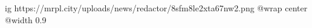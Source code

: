  
 
 
 
 

\ifcmt
  ig https://mrpl.city/uploads/news/redactor/8sfm8le2xta67nw2.png
  @wrap center
  @width 0.9
\fi
